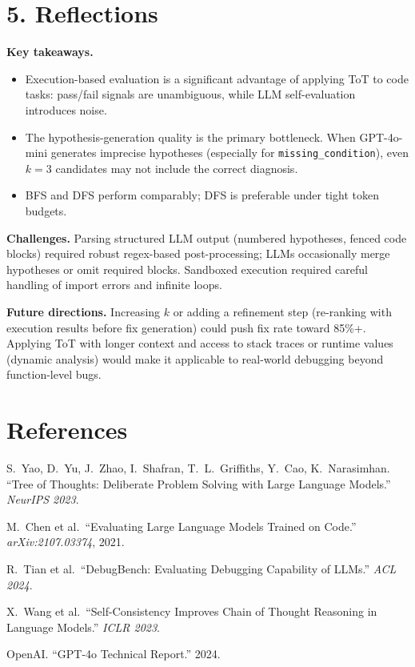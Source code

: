 \documentclass[11pt,letterpaper]{article}
\begin{document}
\section*{5. Reflections}

\textbf{Key takeaways.}
\begin{itemize}[noitemsep,topsep=2pt]
  \item Execution-based evaluation is a significant advantage of applying ToT to code tasks:
    pass/fail signals are unambiguous, while LLM self-evaluation introduces noise.
  \item The hypothesis-generation quality is the primary bottleneck. When GPT-4o-mini generates
    imprecise hypotheses (especially for \texttt{missing\_condition}), even $k=3$ candidates
    may not include the correct diagnosis.
  \item BFS and DFS perform comparably; DFS is preferable under tight token budgets.
\end{itemize}

\textbf{Challenges.}
Parsing structured LLM output (numbered hypotheses, fenced code blocks) required robust
regex-based post-processing; LLMs occasionally merge hypotheses or omit required blocks.
Sandboxed execution required careful handling of import errors and infinite loops.

\textbf{Future directions.}
Increasing $k$ or adding a refinement step (re-ranking with execution results before fix generation)
could push fix rate toward 85\%+.
Applying ToT with longer context and access to stack traces or runtime values (dynamic analysis)
would make it applicable to real-world debugging beyond function-level bugs.

\section*{References}

\begin{enumerate}[label={[\arabic*]},noitemsep,topsep=2pt]
  \item \label{yao2023tot}
    S.\ Yao, D.\ Yu, J.\ Zhao, I.\ Shafran, T.\ L.\ Griffiths, Y.\ Cao, K.\ Narasimhan.
    ``Tree of Thoughts: Deliberate Problem Solving with Large Language Models.''
    \emph{NeurIPS 2023}.

  \item
    M.\ Chen et al.\ ``Evaluating Large Language Models Trained on Code.''
    \emph{arXiv:2107.03374}, 2021.

  \item
    R.\ Tian et al.\ ``DebugBench: Evaluating Debugging Capability of LLMs.''
    \emph{ACL 2024}.

  \item
    X.\ Wang et al.\ ``Self-Consistency Improves Chain of Thought Reasoning in Language Models.''
    \emph{ICLR 2023}.

  \item
    OpenAI. ``GPT-4o Technical Report.'' 2024.
\end{enumerate}
\end{document}
